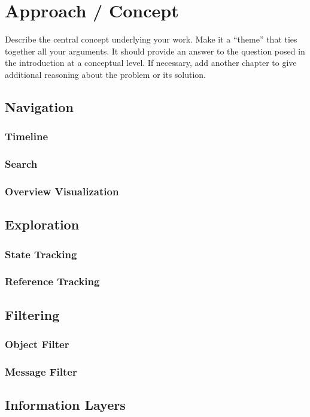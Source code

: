 \chapter{Approach / Concept}
\label{c:approach}

Describe the central concept underlying your work. Make it a ``theme'' that ties together all your arguments. It should provide an answer to the question posed in the introduction at a conceptual level. If necessary, add another chapter to give additional reasoning about the problem or its solution.

\section{Navigation}
\subsection{Timeline}
\subsection{Search}
\subsection{Overview Visualization}

\section{Exploration}
\subsection{State Tracking}
\subsection{Reference Tracking}

\section{Filtering}
\subsection{Object Filter}
\subsection{Message Filter}

\section{Information Layers}